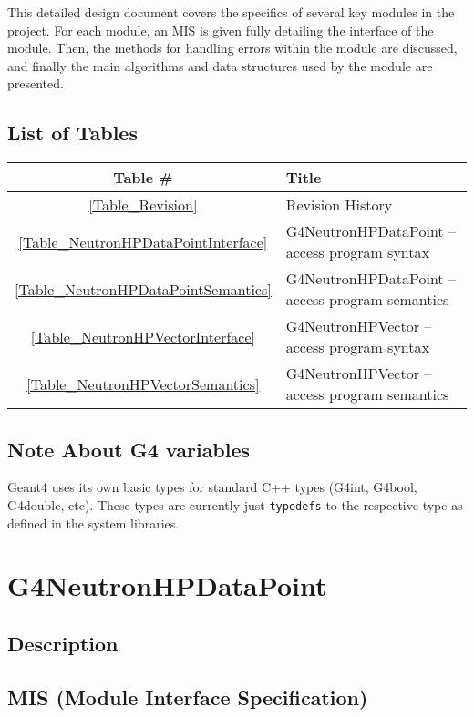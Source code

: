 \documentclass[12pt]{article}
\begin{document}
This detailed design document covers the specifics of several key modules in the project. For each module, an MIS is given fully detailing the interface of the module. Then, the methods for handling errors within the module are discussed, and finally the main algorithms and data structures used by the module are presented.

\subsection{List of Tables}
\begin{center}
\begin{tabular}{cl}
\toprule
\bf Table \# & \bf Title\\\midrule
\ref{Table_Revision} & Revision History\\
\ref{Table_NeutronHPDataPointInterface} & G4NeutronHPDataPoint -- access program syntax\\
\ref{Table_NeutronHPDataPointSemantics} & G4NeutronHPDataPoint -- access program semantics\\
\ref{Table_NeutronHPVectorInterface} & G4NeutronHPVector -- access program syntax\\
\ref{Table_NeutronHPVectorSemantics} & G4NeutronHPVector -- access program semantics\\
\bottomrule
\end{tabular}
\end{center}

\subsection{Note About G4 variables}
Geant4 uses its own basic types for standard C++ types (G4int, G4bool, G4double, etc). These types are currently just \texttt{typedefs} to the respective type as defined in the system libraries.


\section{G4NeutronHPDataPoint}
\subsection{Description}

\subsection{MIS (Module Interface Specification)}
\end{document}
